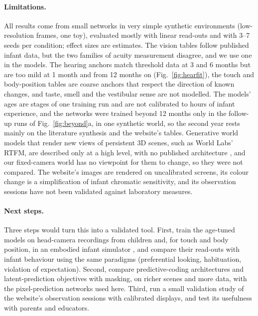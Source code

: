 \documentclass{article}
\begin{document}
\paragraph{Limitations.} All results come from small networks in very simple synthetic environments (low-resolution frames, one toy), evaluated mostly with linear read-outs and with 3--7 seeds per condition; effect sizes are estimates. The vision tables follow published infant data, but the two families of acuity measurement disagree, and we use one in the models. The hearing anchors match threshold data at 3 and 6 months but are too mild at 1 month and from 12 months on (Fig.~\ref{fig:hearfit}), the touch and body-position tables are coarse anchors that respect the direction of known changes, and taste, smell and the vestibular sense are not modelled. The models' ages are stages of one training run and are not calibrated to hours of infant experience, and the networks were trained beyond 12 months only in the follow-up runs of Fig.~\ref{fig:beyond}a, in one synthetic world, so the second year rests mainly on the literature synthesis and the website's tables. Generative world models that render new views of persistent 3D scenes, such as World Labs' RTFM, are described only at a high level, with no published architecture \autocite{worldlabs2025rtfm}, and our fixed-camera world has no viewpoint for them to change, so they were not compared. The website's images are rendered on uncalibrated screens, its colour change is a simplification of infant chromatic sensitivity, and its observation sessions have not been validated against laboratory measures.

\paragraph{Next steps.} Three steps would turn this into a validated tool. First, train the age-tuned models on head-camera recordings from children \autocite{sullivan2021saycam,long2024babyview} and, for touch and body position, in an embodied infant simulator \autocite{mattern2024mimo}, and compare their read-outs with infant behaviour using the same paradigms (preferential looking, habituation, violation of expectation). Second, compare predictive-coding architectures \autocite{rao1999predictive,lotter2017deep} and latent-prediction objectives with masking, on richer scenes and more data, with the pixel-prediction networks used here. Third, run a small validation study of the website's observation sessions with calibrated displays, and test its usefulness with parents and educators.
\end{document}
